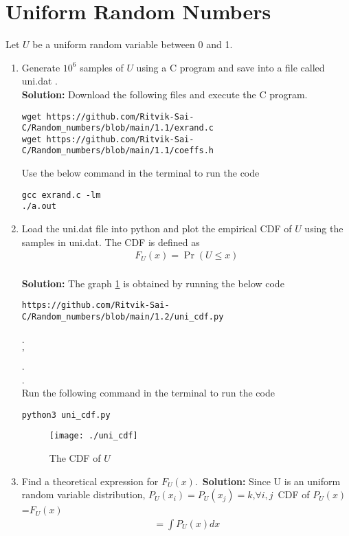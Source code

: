 \documentclass[journal,12pt,twocolumn]{IEEEtran}
\renewcommand\thesection{\arabic{section}}
\providecommand{\pr}[1]{\ensuremath{\Pr\left(#1\right)}}
\theoremstyle{remark}
\newcommand{\solution}{\noindent \textbf{Solution: }}
\numberwithin{equation}{section}
\begin{document}
\section{Uniform Random Numbers}
Let $U$ be a uniform random variable between 0 and 1.
\begin{enumerate}[label=\thesection.\arabic*
,ref=\thesection.\theenumi]
\item Generate $10^6$ samples of $U$ using a C program and save into a file called uni.dat .
\\
\solution Download the following files and execute the  C program.
\begin{lstlisting}
wget https://github.com/Ritvik-Sai-C/Random_numbers/blob/main/1.1/exrand.c
wget https://github.com/Ritvik-Sai-C/Random_numbers/blob/main/1.1/coeffs.h
\end{lstlisting}
Use the below command in the terminal to run the code
\begin{lstlisting}
gcc exrand.c -lm
./a.out
\end{lstlisting}
%
\item
Load the uni.dat file into python and plot the empirical CDF of $U$ using the samples in uni.dat. The CDF is defined as
\begin{align}
F_{U}(x) = \pr{U \le x}
\end{align}
\\
\solution 
The graph \ref{fig:uni_cdf} is obtained by running the below code
\begin{lstlisting}
https://github.com/Ritvik-Sai-C/Random_numbers/blob/main/1.2/uni_cdf.py
\end{lstlisting}
.\\
'\\
.\\
.\\
Run the following command in the terminal to run the code
\begin{lstlisting}
python3 uni_cdf.py
\end{lstlisting}
\begin{figure}[h]
\centering
\texttt{[image: ./uni\_cdf]}
\caption{The CDF of $U$}
\label{fig:uni_cdf}
\end{figure}
%
\item
Find a  theoretical expression for $F_{U}(x)$.\
\solution
Since U is an uniform random variable distribution, $P_{U}(x_{i})=P_{U}(x_{j})=k$,$\forall i,j$\
	CDF of $P_{U}(x)$=$F_{U}(x)$\
	\begin{align}
	=\int P_{U}(x) dx\\

\end{align}
\end{enumerate}
\end{document}

